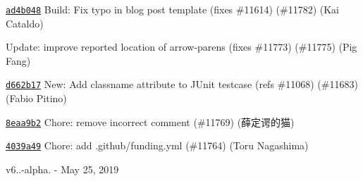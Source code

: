 \begin{DoxyItemize}
\item \href{https://github.com/eslint/eslint/commit/ad4b048c6d034cbd7fd97deb4390d059bde8803f}{\texttt{ {\ttfamily ad4b048}}} Build\+: Fix typo in blog post template (fixes \#11614) (\#11782) (Kai Cataldo)
\item \href{https://github.com/eslint/eslint/commit/9590587cef74c936ef9b7ce2d22a71e2fd0fbbc4}{\texttt{ {}}} Update\+: improve reported location of arrow-\/parens (fixes \#11773) (\#11775) (Pig Fang)
\item \href{https://github.com/eslint/eslint/commit/d662b178c7dad193201564d16f7977af2f81ebcf}{\texttt{ {\ttfamily d662b17}}} New\+: Add classname attribute to JUnit testcase (refs \#11068) (\#11683) (Fabio Pitino)
\item \href{https://github.com/eslint/eslint/commit/8eaa9b259dc08dfb48269b1e4413d0d47698ed87}{\texttt{ {\ttfamily 8eaa9b2}}} Chore\+: remove incorrect comment (\#11769) (薛定谔的猫)
\item \href{https://github.com/eslint/eslint/commit/4039a49177f2fefacd747050b420c0c4560b7d4b}{\texttt{ {\ttfamily 4039a49}}} Chore\+: add .github/funding.\+yml (\#11764) (Toru Nagashima)
\end{DoxyItemize}

v6..-\/alpha. -\/ May 25, 2019


